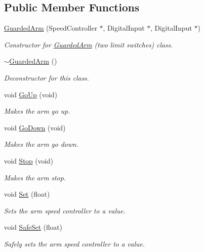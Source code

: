 \subsection*{\-Public \-Member \-Functions}
\begin{DoxyCompactItemize}
\item 
\hyperlink{class_guarded_arm_a50daac1eec1e66a21d69b8a4b3d8ad7e}{\-Guarded\-Arm} (\-Speed\-Controller $\ast$, \-Digital\-Input $\ast$, \-Digital\-Input $\ast$)
\begin{DoxyCompactList}\small\item\em \-Constructor for \hyperlink{class_guarded_arm}{\-Guarded\-Arm} (two limit switches) class. \end{DoxyCompactList}\item 
\hyperlink{class_guarded_arm_a2aa5c661eafac76ddf5a997e9f1260cb}{$\sim$\-Guarded\-Arm} ()
\begin{DoxyCompactList}\small\item\em \-Deconstructor for this class. \end{DoxyCompactList}\item 
void \hyperlink{class_guarded_arm_a1dc67f5a9a97677657e8a53b58b9e55c}{\-Go\-Up} (void)
\begin{DoxyCompactList}\small\item\em \-Makes the arm go up. \end{DoxyCompactList}\item 
void \hyperlink{class_guarded_arm_a7563ed8cb83a3058948dc54f66380068}{\-Go\-Down} (void)
\begin{DoxyCompactList}\small\item\em \-Makes the arm go down. \end{DoxyCompactList}\item 
void \hyperlink{class_guarded_arm_ac82badeaa41ea869155513c164a793cb}{\-Stop} (void)
\begin{DoxyCompactList}\small\item\em \-Makes the arm stop. \end{DoxyCompactList}\item 
void \hyperlink{class_guarded_arm_af9bf7d089d843f1804c7e75c915c74d8}{\-Set} (float)
\begin{DoxyCompactList}\small\item\em \-Sets the arm speed controller to a value. \end{DoxyCompactList}\item 
void \hyperlink{class_guarded_arm_ac86e229ee92ee82ca6234047e5c2696b}{\-Safe\-Set} (float)
\begin{DoxyCompactList}\small\item\em \-Safely sets the arm speed controller to a value. \end{DoxyCompactList}\end{DoxyCompactItemize}
